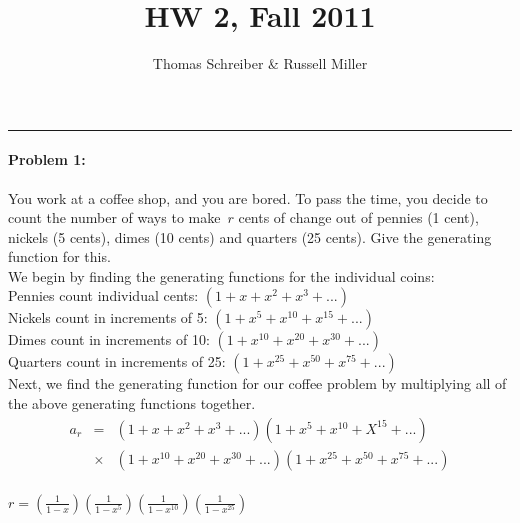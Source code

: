 \documentclass{article}
\author{Thomas Schreiber \& Russell Miller}
\title{HW 2, Fall 2011}
\begin{document}
\maketitle
\begin{center}
\hrule
\end{center}
\vspace*{1ex}

\paragraph{Problem 1:} You work at a coffee shop, and you are bored.
To pass the time, you decide to count the number of ways to make~$r$
cents of change out of pennies (1 cent), nickels (5 cents), dimes (10
cents) and quarters (25 cents).  Give the generating function for this. \\

We begin by finding the generating functions for the individual coins: \\

Pennies count individual cents: ${(1 + x + x^2 + x^3 + ...)}$ \\

Nickels count in increments of 5: ${(1 + x^5 + x^{10} + x^{15} + ...)}$ \\

Dimes count in increments of 10: ${(1 + x^{10} + x^{20} + x^{30} + ...)}$ \\

Quarters count in increments of 25: ${(1 + x^{25} + x^{50} + x^{75} + ...)}$ \\

Next, we find the generating function for our coffee problem by multiplying all of the above generating functions together. \\

\begin{eqnarray*}
  a_r & = & (1 + x + x^2 + x^3 + ...) (1 + x^5 + x^{10} + X^{15} + ...) \\
    & \times & (1 + x^{10} + x^{20} + x^{30} + ...) (1 + x^{25} + x^{50} + x^{75} + ...) \\
\end{eqnarray*}

\begin{center}
  ${\boxed{ r = ( \frac{1}{1 - x} ) ( \frac{1}{1 - x^{5}} ) ( \frac{1}{1 - x^{10}} ) ( \frac{1}{1 - x^{25}} ) } }$
\end{center}

\pagebreak
\end{document}
